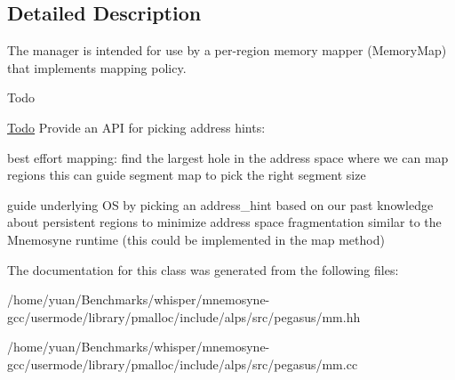 \subsection{Detailed Description}
The manager is intended for use by a per-\/region memory mapper (Memory\+Map) that implements mapping policy.

\begin{DoxyRefDesc}{Todo}
\item[\hyperlink{todo__todo000001}{Todo}]Provide an A\+PI for picking address hints\+:
\begin{DoxyItemize}
\item best effort mapping\+: find the largest hole in the address space where we can map regions this can guide segment map to pick the right segment size
\item guide underlying OS by picking an address\+\_\+hint based on our past knowledge about persistent regions to minimize address space fragmentation similar to the Mnemosyne runtime (this could be implemented in the map method) 
\end{DoxyItemize}\end{DoxyRefDesc}


The documentation for this class was generated from the following files\+:\begin{DoxyCompactItemize}
\item 
/home/yuan/\+Benchmarks/whisper/mnemosyne-\/gcc/usermode/library/pmalloc/include/alps/src/pegasus/mm.\+hh\item 
/home/yuan/\+Benchmarks/whisper/mnemosyne-\/gcc/usermode/library/pmalloc/include/alps/src/pegasus/mm.\+cc\end{DoxyCompactItemize}
